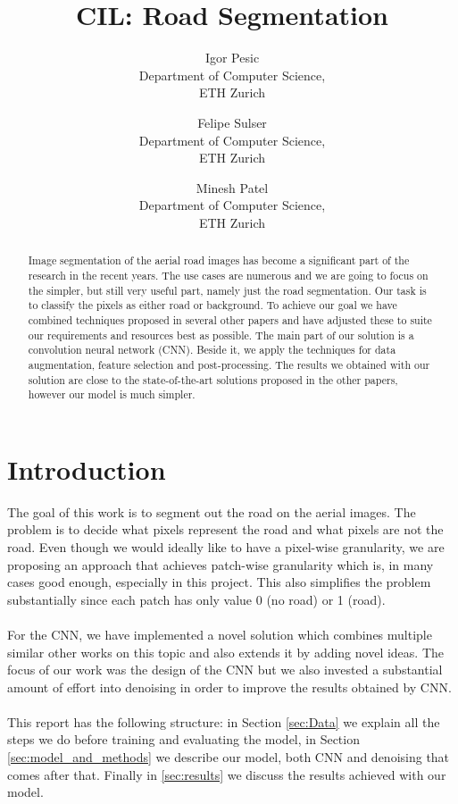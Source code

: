 \documentclass[10pt,conference,compsocconf]{IEEEtran}
\begin{document}
\title{CIL: Road Segmentation}

\author{
  Igor Pesic\\
  Department of Computer Science,\\ ETH Zurich
  \and
  Felipe Sulser\\
  Department of Computer Science,\\ ETH Zurich
  \and
  Minesh Patel\\
  Department of Computer Science,\\ ETH Zurich
}

\maketitle

\begin{abstract}
  Image segmentation of the aerial road images has become a significant part of the research in the recent years.
  The use cases are numerous and we are going to focus on the simpler, but still very useful part, namely just the road
  segmentation. Our task is to classify the pixels as either road or background. To achieve our goal we have combined
  techniques proposed in several other papers and have adjusted these to suite our requirements and resources best as possible.  
  The main part of our solution is a convolution neural network (CNN). Beside it, we apply the techniques for data augmentation,
  feature selection and post-processing. The results we obtained with our solution are close to the state-of-the-art
  solutions proposed in the other papers, however our model is much simpler.
\end{abstract}

\section{Introduction}

The goal of this work is to segment out the road on the aerial images. The problem is to decide what pixels
represent the road and what pixels are not the road. Even though we would ideally like to have a pixel-wise
granularity, we are proposing an approach that achieves patch-wise granularity which is, in many cases good enough,
especially in this project. This also simplifies the problem substantially since each patch has only value 0 (no road) or 1 (road). \\
\\
For the CNN, we have implemented a novel solution which combines multiple similar other works on this topic 
and also extends it by adding novel ideas. The focus of our work was the design of the
CNN but we also invested a substantial amount of effort into denoising in order
to improve the results obtained by CNN.\\
\\
This report has the following structure: in Section \ref{sec:Data} we explain all the steps we do before training
and evaluating the model, in Section \ref{sec:model_and_methods} we describe our model, both CNN and denoising
that comes after that. Finally in \ref{sec:results} we discuss the results achieved with our model.
\end{document}
